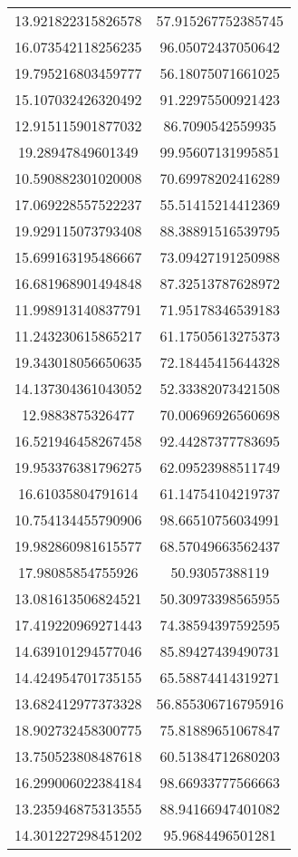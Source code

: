 \begin{table}
\begin{tabular}{cc}
13.921822315826578 & 57.915267752385745 \\
16.073542118256235 & 96.05072437050642 \\
19.795216803459777 & 56.18075071661025 \\
15.107032426320492 & 91.22975500921423 \\
12.915115901877032 & 86.7090542559935 \\
19.28947849601349 & 99.95607131995851 \\
10.590882301020008 & 70.69978202416289 \\
17.069228557522237 & 55.51415214412369 \\
19.929115073793408 & 88.38891516539795 \\
15.699163195486667 & 73.09427191250988 \\
16.681968901494848 & 87.32513787628972 \\
11.998913140837791 & 71.95178346539183 \\
11.243230615865217 & 61.17505613275373 \\
19.343018056650635 & 72.18445415644328 \\
14.137304361043052 & 52.33382073421508 \\
12.9883875326477 & 70.00696926560698 \\
16.521946458267458 & 92.44287377783695 \\
19.953376381796275 & 62.09523988511749 \\
16.61035804791614 & 61.14754104219737 \\
10.754134455790906 & 98.66510756034991 \\
19.982860981615577 & 68.57049663562437 \\
17.98085854755926 & 50.93057388119 \\
13.081613506824521 & 50.30973398565955 \\
17.419220969271443 & 74.38594397592595 \\
14.639101294577046 & 85.89427439490731 \\
14.424954701735155 & 65.58874414319271 \\
13.682412977373328 & 56.855306716795916 \\
18.902732458300775 & 75.81889651067847 \\
13.750523808487618 & 60.51384712680203 \\
16.299006022384184 & 98.66933777566663 \\
13.235946875313555 & 88.94166947401082 \\
14.301227298451202 & 95.9684496501281 \\

\end{tabular}
\end{table}
